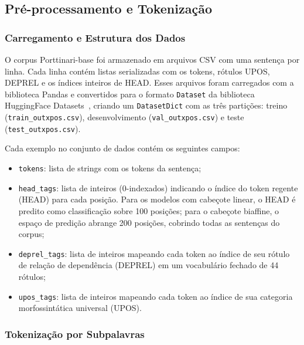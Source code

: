 \subsection*{Pré-processamento e Tokenização}

\subsubsection*{Carregamento e Estrutura dos Dados}

O corpus Porttinari-base foi armazenado em arquivos CSV com uma sentença por linha. Cada linha
contém listas serializadas com os tokens, rótulos UPOS, DEPREL e os índices inteiros de HEAD.
Esses arquivos foram carregados com a biblioteca Pandas e convertidos para o formato
\texttt{Dataset} da biblioteca HuggingFace Datasets~\citep{wolf2020transformers}, criando um
\texttt{DatasetDict} com as três partições: treino (\texttt{train\_outxpos.csv}),
desenvolvimento (\texttt{val\_outxpos.csv}) e teste (\texttt{test\_outxpos.csv}).

Cada exemplo no conjunto de dados contém os seguintes campos:

\begin{itemize}
    \item \texttt{tokens}: lista de strings com os tokens da sentença;
    \item \texttt{head\_tags}: lista de inteiros (0-indexados) indicando o índice do token
          regente (HEAD) para cada posição. Para os modelos com cabeçote linear, o HEAD é
          predito como classificação sobre 100 posições; para o cabeçote biaffine, o espaço
          de predição abrange 200 posições, cobrindo todas as sentenças do corpus;
    \item \texttt{deprel\_tags}: lista de inteiros mapeando cada token ao índice de seu rótulo
          de relação de dependência (DEPREL) em um vocabulário fechado de 44 rótulos;
    \item \texttt{upos\_tags}: lista de inteiros mapeando cada token ao índice de sua
          categoria morfossintática universal (UPOS).
\end{itemize}

\subsubsection*{Tokenização por Subpalavras}

